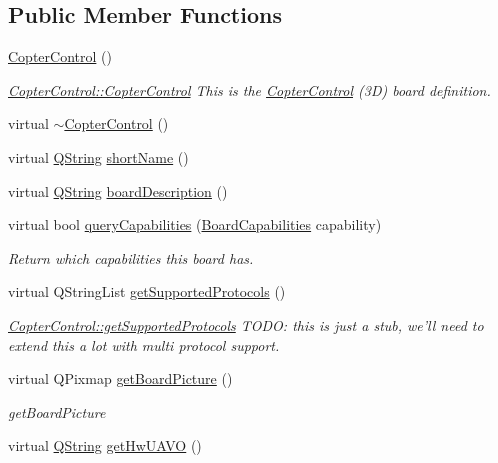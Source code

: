 \subsection*{\-Public \-Member \-Functions}
\begin{DoxyCompactItemize}
\item 
\hyperlink{group___boards___open_pilot_plugin_gadbec7022641a51cd87f98ca7dc734dcf}{\-Copter\-Control} ()
\begin{DoxyCompactList}\small\item\em \hyperlink{group___boards___open_pilot_plugin_gadbec7022641a51cd87f98ca7dc734dcf}{\-Copter\-Control\-::\-Copter\-Control} \-This is the \hyperlink{class_copter_control}{\-Copter\-Control} (3\-D) board definition. \end{DoxyCompactList}\item 
virtual \hyperlink{group___boards___open_pilot_plugin_ga42d298de6b0fb7cc74d9206f1cf18d40}{$\sim$\-Copter\-Control} ()
\item 
virtual \hyperlink{group___u_a_v_objects_plugin_gab9d252f49c333c94a72f97ce3105a32d}{\-Q\-String} \hyperlink{group___boards___open_pilot_plugin_ga0d1055d64f286350d10a89536e595046}{short\-Name} ()
\item 
virtual \hyperlink{group___u_a_v_objects_plugin_gab9d252f49c333c94a72f97ce3105a32d}{\-Q\-String} \hyperlink{group___boards___open_pilot_plugin_ga68dacf81a6b453c748b0403fa459a1e4}{board\-Description} ()
\item 
virtual bool \hyperlink{group___boards___open_pilot_plugin_ga5717283400c4b93b0c580a2af504a5d2}{query\-Capabilities} (\hyperlink{group___core_plugin_ga01b09218f2a13aaeee6db007ac6bd967}{\-Board\-Capabilities} capability)
\begin{DoxyCompactList}\small\item\em \-Return which capabilities this board has. \end{DoxyCompactList}\item 
virtual \-Q\-String\-List \hyperlink{group___boards___open_pilot_plugin_ga5cf6a3278133728b41ab54897e6e8ef0}{get\-Supported\-Protocols} ()
\begin{DoxyCompactList}\small\item\em \hyperlink{group___boards___open_pilot_plugin_ga5cf6a3278133728b41ab54897e6e8ef0}{\-Copter\-Control\-::get\-Supported\-Protocols} \-T\-O\-D\-O\-: this is just a stub, we'll need to extend this a lot with multi protocol support. \end{DoxyCompactList}\item 
virtual \-Q\-Pixmap \hyperlink{group___boards___open_pilot_plugin_ga06b9d173fe63133904394ae9f15d48ba}{get\-Board\-Picture} ()
\begin{DoxyCompactList}\small\item\em get\-Board\-Picture \end{DoxyCompactList}\item 
virtual \hyperlink{group___u_a_v_objects_plugin_gab9d252f49c333c94a72f97ce3105a32d}{\-Q\-String} \hyperlink{group___boards___open_pilot_plugin_ga844238f46b4df3aaf945874c9a6797ca}{get\-Hw\-U\-A\-V\-O} ()
\end{DoxyCompactItemize}


